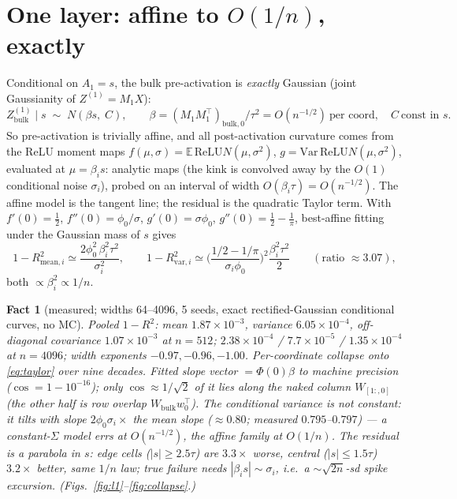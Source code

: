 \documentclass[10pt]{article}
\newcommand{\ReLU}{\mathrm{ReLU}}
\newcommand{\Var}{\mathrm{Var}}
\newcommand{\E}{\mathbb{E}}
\newtheorem{fact}{Fact}
\begin{document}
\section{One layer: affine to $O(1/n)$, exactly}
Conditional on $A_1 = s$, the bulk pre-activation is \emph{exactly} Gaussian
(joint Gaussianity of $Z^{(1)} = M_1X$):
\[
Z^{(1)}_{\mathrm{bulk}}\mid s \;\sim\; N(\beta s,\; C),\qquad
\beta = (M_1M_1^\top)_{\mathrm{bulk},0}/\tau^2 = O(n^{-1/2})\ \text{per coord},\quad C\ \text{const in }s .
\]
So pre-activation is trivially affine, and all post-activation curvature comes from the ReLU
moment maps $f(\mu,\sigma)=\E\,\ReLU N(\mu,\sigma^2)$, $g=\Var\,\ReLU N(\mu,\sigma^2)$, evaluated
at $\mu=\beta_i s$: analytic maps (the kink is convolved away by the $O(1)$ conditional noise
$\sigma_i$), probed on an interval of width $O(\beta_i\tau)=O(n^{-1/2})$. The affine model is the
tangent line; the residual is the quadratic Taylor term. With $f'(0)=\tfrac12$,
$f''(0)=\phi_0/\sigma$, $g'(0)=\sigma\phi_0$, $g''(0)=\tfrac12-\tfrac1\pi$, best-affine
fitting under the Gaussian mass of $s$ gives
\begin{equation}
1-R^2_{\mathrm{mean},i} \simeq \frac{2\phi_0^2\,\beta_i^2\tau^2}{\sigma_i^2},\qquad
1-R^2_{\mathrm{var},i} \simeq \Big(\frac{1/2-1/\pi}{\sigma_i\phi_0}\Big)^{\!2}\frac{\beta_i^2\tau^2}{2}
\qquad(\text{ratio } \approx 3.07),
\label{eq:taylor}
\end{equation}
both $\propto \beta_i^2 \propto 1/n$.

\begin{fact}[measured; widths 64--4096, 5 seeds, exact rectified-Gaussian conditional curves, no MC]
Pooled $1-R^2$: mean $1.87\times10^{-3}$, variance $6.05\times10^{-4}$, off-diagonal covariance
$1.07\times10^{-3}$ at $n=512$; $2.38\times10^{-4}$ / $7.7\times10^{-5}$ / $1.35\times10^{-4}$ at
$n=4096$; width exponents $-0.97,-0.96,-1.00$. Per-coordinate collapse onto \eqref{eq:taylor}
over nine decades. Fitted slope vector $=\Phi(0)\beta$ to machine precision
($\cos = 1-10^{-16}$); only $\cos\approx 1/\sqrt2$ of it lies along the naked column
$W_{[1:,0]}$ (the other half is row overlap $W_{\mathrm{bulk}}w_0^\top$). The conditional
variance is \emph{not} constant: it tilts with slope $2\phi_0\sigma_i \times$ the mean slope
($\approx 0.80$; measured $0.795$--$0.797$) --- a constant-$\Sigma$ model errs at $O(n^{-1/2})$,
the affine family at $O(1/n)$. The residual is a parabola in $s$: edge cells
($|s|\ge2.5\tau$) are $3.3\times$ worse, central ($|s|\le1.5\tau$) $3.2\times$ better, same
$1/n$ law; true failure needs $|\beta_i s|\sim\sigma_i$, i.e.\ a $\sim\!\sqrt{2n}$-sd spike
excursion. (Figs.~\ref{fig:l1}--\ref{fig:collapse}.)
\end{fact}
\end{document}
